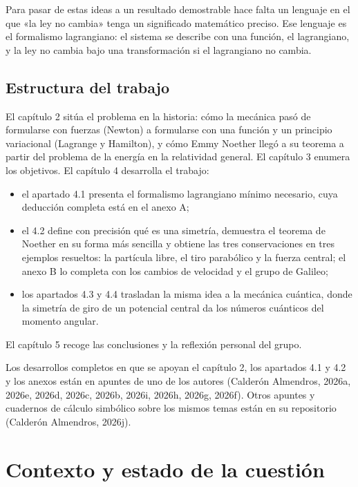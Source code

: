 \documentclass[11pt,a4paper,spanish]{book}
\providecommand{\tightlist}{%
  \setlength{\itemsep}{0pt}\setlength{\parskip}{0pt}}
\begin{document}
Para pasar de estas ideas a un resultado demostrable hace falta un
lenguaje en el que «la ley no cambia» tenga un significado matemático
preciso. Ese lenguaje es el formalismo lagrangiano: el sistema se
describe con una función, el lagrangiano, y la ley no cambia bajo una
transformación si el lagrangiano no cambia.

\section{Estructura del trabajo}\label{estructura-del-trabajo}

El capítulo 2 sitúa el problema en la historia: cómo la mecánica pasó de
formularse con fuerzas (Newton) a formularse con una función y un
principio variacional (Lagrange y Hamilton), y cómo Emmy Noether llegó a
su teorema a partir del problema de la energía en la relatividad
general. El capítulo 3 enumera los objetivos. El capítulo 4 desarrolla
el trabajo:

\begin{itemize}
\tightlist
\item
  el apartado 4.1 presenta el formalismo lagrangiano mínimo necesario,
  cuya deducción completa está en el anexo A;
\item
  el 4.2 define con precisión qué es una simetría, demuestra el teorema
  de Noether en su forma más sencilla y obtiene las tres conservaciones
  en tres ejemplos resueltos: la partícula libre, el tiro parabólico y
  la fuerza central; el anexo B lo completa con los cambios de velocidad
  y el grupo de Galileo;
\item
  los apartados 4.3 y 4.4 trasladan la misma idea a la mecánica
  cuántica, donde la simetría de giro de un potencial central da los
  números cuánticos del momento angular.
\end{itemize}

El capítulo 5 recoge las conclusiones y la reflexión personal del grupo.

Los desarrollos completos en que se apoyan el capítulo 2, los apartados
4.1 y 4.2 y los anexos están en apuntes de uno de los autores (Calderón
Almendros, 2026a, 2026e, 2026d, 2026c, 2026b, 2026i, 2026h, 2026g,
2026f). Otros apuntes y cuadernos de cálculo simbólico sobre los mismos
temas están en su repositorio (Calderón Almendros, 2026j).

\chapter{Contexto y estado de la
cuestión}\label{contexto-y-estado-de-la-cuestiuxf3n}
\end{document}
